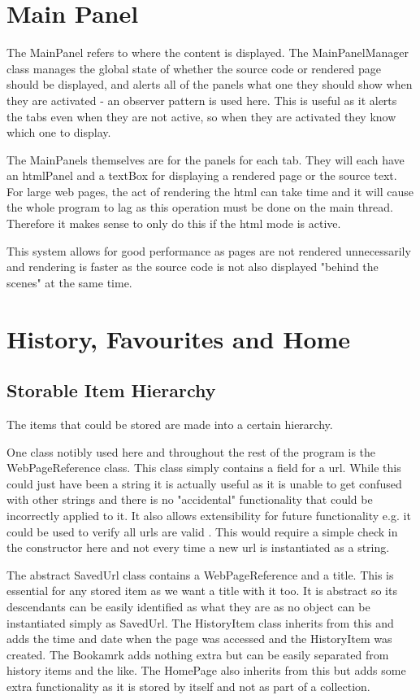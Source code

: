 \documentclass[11pt]{report}
\begin{document}
\section{Main Panel}

The MainPanel refers to where the content is displayed.  The MainPanelManager class manages the global state of whether the source code or rendered page should be displayed, and alerts all of the panels what one they should show when they are activated - an observer pattern is used here.  This is useful as it alerts the tabs even when they are not active, so when they are activated they know which one to display.

The MainPanels themselves are for the panels for each tab.  They will each have an htmlPanel and a textBox for displaying a rendered page or the source text.  For large web pages, the act of rendering the html can take time and it will cause the whole program to lag as this operation must be done on the main thread.  Therefore it makes sense to only do this if the html mode is active.

This system allows for good performance as pages are not rendered unnecessarily and rendering is faster as the source code is not also displayed "behind the scenes" at the same time.

\section{History, Favourites and Home}

\subsection{Storable Item Hierarchy}

The items that could be stored are made into a certain hierarchy.  

One class notibly used here and throughout the rest of the program is the WebPageReference class.  This class simply contains a field for a url.  While this could just have been a string it is actually useful as it is unable to get confused with other strings and there is no "accidental" functionality that could be incorrectly applied to it.  It also allows extensibility for future functionality e.g. it could be used to verify all urls are valid .  This would require a simple check in the constructor here and not every time a new url is instantiated as a string.

The abstract SavedUrl class contains a WebPageReference and a title.  This is essential for any stored item as we want a title with it too.  It is abstract so its descendants can be easily identified as what they are as no object can be instantiated simply as SavedUrl.  The HistoryItem class inherits from this and adds the time and date when the page was accessed and the HistoryItem was created.  The Bookamrk adds nothing extra but can be easily separated from history items and the like.  The HomePage also inherits from this but adds some extra functionality as it is stored by itself and not as part of a collection.
\end{document}
